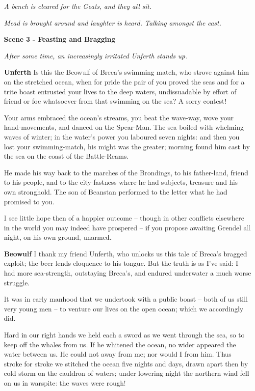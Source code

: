 \documentclass[a4paper]{article}
\begin{document}
{\centerline{\textit{A bench is cleared for the Geats, and they all sit.}}
\centerline{\textit{Mead is brought around and laughter is heard. Talking amongst the cast.}}

\centerline{\textbf{Scene 3 - Feasting and Bragging}}
\centerline{\textit{After some time, an increasingly irritated Unferth stands up.}}

\textbf{Unferth} Is this the Beowulf of Breca's swimming match, 
who strove against him on the stretched ocean,
when for pride the pair of you proved the seas
and for a trite boast entrusted your lives
to the deep waters, undissuadable
by effort of friend or foe whatsoever
from that swimming on the sea? A sorry contest!

Your arms embraced the ocean’s streams,
you beat the wave-way, wove your hand-movements,
and danced on the Spear-Man. The sea boiled with whelming
waves of winter; in the water’s power
you laboured seven nights: and then you lost your swimming-match,
his might was the greater; morning found him
cast by the sea on the coast of the Battle-Reams.

He made his way back to the marches of the Brondings,
to his father-land, friend to his people,
and to the city-fastness where he had subjects, treasure
and his own stronghold. The son of Beanstan
performed to the letter what he had promised to you.

I see little hope then of a happier outcome
– though in other conflicts elsewhere in the world
you may indeed have prospered – if you propose awaiting
Grendel all night, on his own ground, unarmed.

\textbf{Beowulf} I thank my friend Unferth, who unlocks us this tale
of Breca's bragged exploit; 
the beer lends eloquence to his tongue.
But the truth is as I’ve said:
I had more sea-strength, outstaying Breca’s,
and endured underwater a much worse struggle.

It was in early manhood that we undertook
with a public boast – both of us still
very young men – to venture our lives
on the open ocean; which we accordingly did.

Hard in our right hands we held each a sword
as we went through the sea, so to keep off
the whales from us. If he whitened the ocean,
no wider appeared the water between us.
He could not away from me; nor would I from him.
Thus stroke for stroke we stitched the ocean
five nights and days, drawn apart then
by cold storm on the cauldron of waters;
under lowering night the northern wind
fell on us in warspite: the waves were rough!

}
\end{document}
